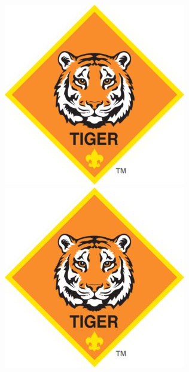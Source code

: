 \documentclass[12pt]{article}
\begin{document}
\noindent\includegraphics[width = .5\textwidth]{TIGER-logo.jpg}\qquad\includegraphics[width = .5\textwidth]{TIGER-logo.jpg}
\end{document}
